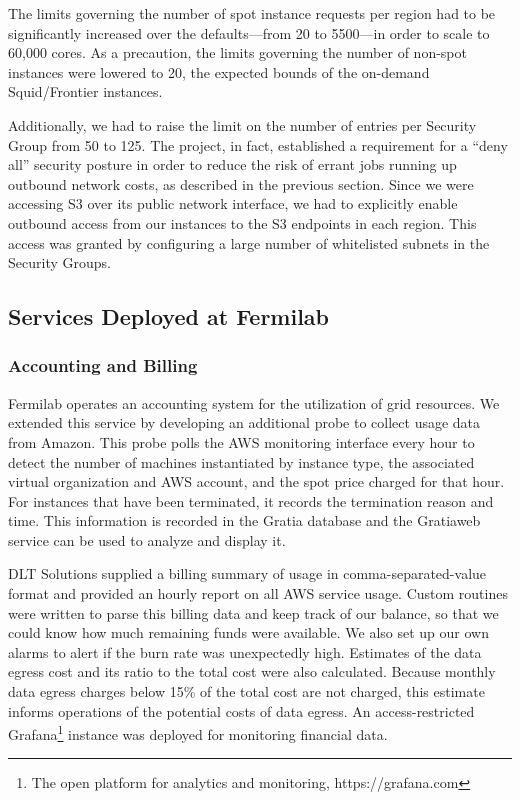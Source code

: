 \documentclass[twocolumn]{svjour3}          %
\begin{document}
The limits governing the number of spot instance requests per region had to be significantly increased over the defaults---from 20 to 5500---in order to scale to 60,000 cores. As a precaution, the limits governing the number of non-spot instances were lowered to 20, the expected bounds of the on-demand Squid/Frontier instances.

Additionally, we had to raise the limit on the number of entries per Security Group from 50 to 125. The project, in fact, established a requirement for a ``deny all'' security posture in order to reduce the risk of errant jobs running up outbound network costs, as described in the previous section.
Since we were accessing S3 over its public network interface, we had to explicitly enable outbound access from our instances to the S3 endpoints in each region. This access was granted by configuring a large number of whitelisted subnets in the Security Groups.


\subsection{Services Deployed at Fermilab}
\subsubsection{Accounting and Billing}
Fermilab operates an accounting system for the utilization of grid resources. We extended this service by developing an additional probe to collect usage data from Amazon. This probe polls the AWS monitoring interface every hour to detect the number of machines instantiated by instance type, the associated virtual organization and AWS account, and the spot price charged for that hour. For instances that have been terminated, it records the termination reason and time. This information is recorded in the Gratia \cite{gratia} database and the Gratiaweb service can be used to analyze and display it.

DLT Solutions supplied a billing summary of usage in comma-separated-value format and provided an hourly report on all AWS service usage. Custom routines were written to parse this billing data and keep track of our
balance, so that we could know how much remaining funds were available.  We also set up our own alarms to alert if the burn rate was unexpectedly high. Estimates of the data egress cost and its ratio to the total cost were also calculated. Because monthly data egress charges below 15\% of the total cost are not charged, this estimate informs operations of the potential costs of data egress. An access-restricted Grafana\footnote{The open platform for analytics and monitoring, https://grafana.com} instance was deployed for monitoring financial data.
\end{document}
